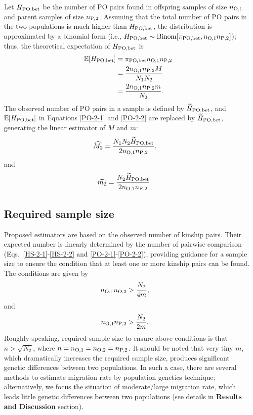 \documentclass[12pt, English]{article}
\begin{document}
\begin{spacing}{1.9}
Let $H_{\rm PO,bet}$ be the number of PO pairs found in offspring samples of size $n_{\rm O, 1}$ and parent samples of size $n_{\rm P, 2}$. Assuming that the total number of PO pairs in the two populations is much higher than $H_{\rm PO,bet}$, the distribution is approximated by a binomial form (i.e., $H_{\rm PO,bet} \sim {\rm Binom}[\pi_{\rm PO,bet}, n_{\rm O, 1} n_{\rm P, 2}]$); thus, the theoretical expectation of $H_{\rm PO,bet}$ is
\begin{align}
\mathbb{E}[H_{\rm PO, bet}] &= \pi_{\rm PO,bet} n_{\rm O, 1} n_{\rm P, 2} \nonumber\\
&= \frac{ 2 n_{\rm O, 1} n_{\rm P, 2} M } { N_{1} N_{2} } \label{PO-2-1} \\
&= \frac{ 2 n_{\rm O, 1} n_{\rm P, 2} m } { N_{2} }.
\label{PO-2-2}
\end{align}
The observed number of PO pairs in a sample is defined by $\widetilde{H}_{\rm PO, bet}$, and $\mathbb{E}[H_{\rm PO, bet}]$ in Equations \ref{PO-2-1} and \ref{PO-2-2} are replaced by $\widetilde{H}_{\rm PO, bet}$, generating the linear estimator of $M$ and $m$:
\begin{align}
\widehat{M_2} &= \frac{N_{1} N_{2} \widetilde{H}_{\rm PO,bet} } {2 n_{\rm O, 1} n_{\rm P, 2} },
\label{PO-3}
\end{align}
and
\begin{align}
\widehat{m_2} &= \frac{N_{2} \widetilde{H}_{\rm PO,bet} } {2 n_{\rm O, 1} n_{\rm P, 2} }.
\label{PO-4}
\end{align}

\subsection{Required sample size}

Proposed estimators are based on the observed number of kinship pairs. Their expected number is linearly determined by the number of pairwise comparison (Eqs.~\ref{HS-2-1}-\ref{HS-2-2} and \ref{PO-2-1}-\ref{PO-2-2}), providing guidance for a sample size to ensure the condition that at least one or more kinship pairs can be found. The conditions are given by
\begin{align}
n_{\rm O, 1} n_{\rm O, 2} &> \frac{ N_{2} } { 4m },
\label{RS-1}
\end{align}
and
\begin{align}
n_{\rm O, 1} n_{\rm P, 2} &> \frac{ N_{2} } { 2m }.
\label{RS-2}
\end{align}
Roughly speaking, required sample size to ensure above conditions is that $n>\sqrt{N_2}$, where $n = n_{\rm O, 1}=n_{\rm O, 2}=n_{\rm P, 2}$. It should be noted that very tiny $m$, which dramatically increases the required sample size, produces significant genetic differences between two populations. In such a case, there are several methods to estimate migration rate by population genetics technique; alternatively, we focus the situation of moderate/large migration rate, which leads little genetic differences between two populations (see details in {\bf Results and Discussion} section). 


\end{spacing}
\end{document}
